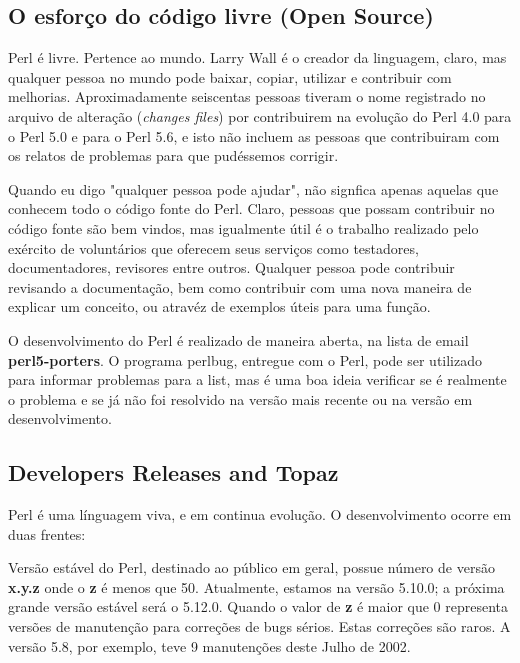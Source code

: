 \documentclass[a4paper,12pt,twoside]{book}
\begin{document}
\subsection{O esfor\c{c}o do código livre (Open Source)}

\noindent Perl é livre. Pertence ao mundo. Larry Wall é o creador da linguagem, claro, mas 
qualquer pessoa no mundo pode baixar, copiar, utilizar e contribuir com melhorias. Aproximadamente 
seiscentas pessoas tiveram o nome registrado no arquivo de alteração (\textit{changes files}) por 
contribuirem na evolução do Perl 4.0 para o Perl 5.0 e para o Perl 5.6, e isto não incluem as 
pessoas que contribuiram com os relatos de problemas para que pudéssemos corrigir.\medskip

\noindent Quando eu digo "qualquer pessoa pode ajudar", não signfica apenas aquelas que 
conhecem todo o código fonte do Perl. Claro, pessoas que possam contribuir no código 
fonte são bem vindos, mas igualmente útil é o trabalho realizado pelo exército de voluntários 
que oferecem seus serviços como testadores, documentadores, revisores entre outros. Qualquer 
pessoa pode contribuir revisando a documenta\c{c}ão, bem como contribuir com uma nova maneira 
de explicar um conceito, ou atravéz de exemplos úteis para uma fun\c{c}ão.\medskip

\noindent O desenvolvimento do Perl é realizado de maneira aberta, na lista de email \textbf{perl5-porters}. 
O programa perlbug, entregue com o Perl, pode ser utilizado para informar problemas 
para a list, mas é uma boa ideia verificar se é realmente o problema e se já não foi 
resolvido na versão mais recente ou na versão em desenvolvimento.

\subsection{Developers Releases and Topaz}

\noindent Perl é uma línguagem viva, e em continua evolu\c{c}ão. O desenvolvimento ocorre em duas frentes:\medskip

\noindent Versão estável do Perl, destinado ao público em geral, possue número de 
versão \textbf{x.y.z} onde o \textbf{z} é menos que 50. Atualmente, estamos na versão 
5.10.0; a próxima grande versão estável será o 5.12.0. Quando o valor de \textbf{z} é 
maior que 0 representa versões de manuten\c{c}ão para corre\c{c}ões de bugs sérios. 
Estas corre\c{c}ões são raros. A versão 5.8, por exemplo, teve 9 manuten\c{c}ões deste Julho de 2002.\medskip
\end{document}
